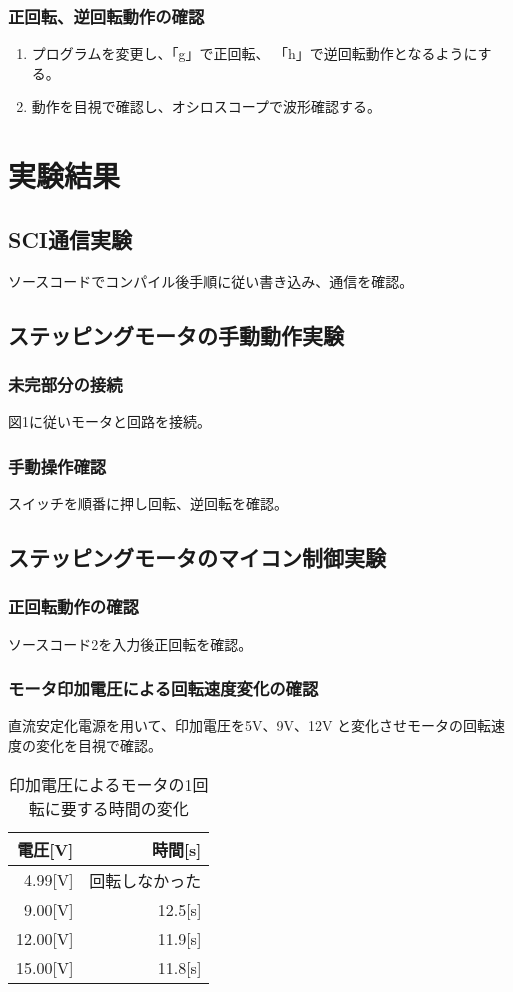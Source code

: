 \documentclass[10pt,a4paper]{jarticle}
\begin{document}
\subsubsection{正回転、逆回転動作の確認}
\begin{enumerate}
 \item プログラムを変更し、「g」で正回転、
 「h」で逆回転動作となるようにする。
 \item 動作を目視で確認し、オシロスコープで波形確認する。
\end{enumerate}
\section{実験結果}
\subsection{SCI通信実験}
ソースコードでコンパイル後手順に従い書き込み、通信を確認。
\subsection{ステッピングモータの手動動作実験}
\subsubsection{未完部分の接続}
図1に従いモータと回路を接続。
\subsubsection{手動操作確認}
スイッチを順番に押し回転、逆回転を確認。
\subsection{ステッピングモータのマイコン制御実験}
\subsubsection{正回転動作の確認}
ソースコード2を入力後正回転を確認。
\subsubsection{モータ印加電圧による回転速度変化の確認}
直流安定化電源を用いて、印加電圧を5V、9V、12V
と変化させモータの回転速度の変化を目視で確認。\par
\begin{table}[htbp]
 \caption{印加電圧によるモータの1回転に要する時間の変化}
 \label{denatu}
 \centering
 \begin{tabular}{|r|r|}\hline
   電圧[V]&時間[s]\\ \hline
   4.99[V]&回転しなかった\\ \hline
   9.00[V]&12.5[s]\\ \hline
   12.00[V]&11.9[s]\\ \hline
   15.00[V]&11.8[s]\\ \hline
 \end{tabular}
\end{table}
\end{document}

